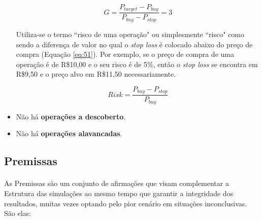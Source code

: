 \begin{itemize}
    \begin{equation} \label{eq:50}
        G = \dfrac{P_{target} - P_{buy}}{P_{buy} - P_{stop}} = 3
    \end{equation}

    Utiliza-se o termo ``risco de uma operação" ou simplesmente ``risco" como sendo a diferença de valor no qual o \textit{stop loss} é colocado abaixo do preço de compra (Equação \ref{eq:51}). Por exemplo, se o preço de compra de uma operação é de R\$10,00 e o seu risco é de 5\%, então o \textit{stop loss} se encontra em R\$9,50 e o preço alvo em R\$11,50 necessariamente.

    \begin{equation} \label{eq:51}
        Risk = \dfrac{P_{buy} - P_{stop}}{P_{buy}}
    \end{equation}

    \item Não há \textbf{operações a descoberto}.
    \item Não há \textbf{operações alavancadas}.

\end{itemize}



\FloatBarrier
\subsection{Premissas}

\paragraph{} As Premissas são um conjunto de afirmações que visam complementar a Estrutura das simulações ao mesmo tempo que garantir a integridade dos resultados, muitas vezes optando pelo pior cenário em situações inconclusivas. São elas:

